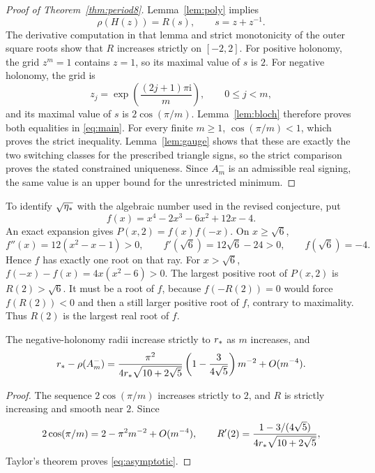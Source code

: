 \begin{proof}[Proof of Theorem~\ref{thm:period8}]
Lemma~\ref{lem:poly} implies
\[
 \rho(H(z))=R(s),\qquad s=z+z^{-1}.
\]
The derivative computation in that lemma and strict monotonicity of the
outer square roots show that $R$ increases strictly on $[-2,2]$.
For positive holonomy, the grid $z^m=1$ contains $z=1$, so its maximal
value of $s$ is $2$. For negative holonomy, the grid is
\[
 z_j=\exp\!\left(\frac{(2j+1)\pi\mathrm i}{m}\right),
 \qquad 0\le j<m,
\]
and its maximal value of $s$ is $2\cos(\pi/m)$. Lemma~\ref{lem:bloch}
therefore proves both equalities in \eqref{eq:main}.
For every finite $m\ge1$, $\cos(\pi/m)<1$, which proves the strict
inequality. Lemma~\ref{lem:gauge} shows that these are exactly the two
switching classes for the prescribed triangle signs, so the strict
comparison proves the stated constrained uniqueness. Since $A_m^-$ is
an admissible real signing, the same value is an upper bound for the unrestricted minimum.
\end{proof}

To identify $\sqrt{\eta_*}$ with the algebraic number used in the revised
conjecture, put
\[
 f(x)=x^4-2x^3-6x^2+12x-4.
\]
An exact expansion gives $P(x,2)=f(x)f(-x)$. On $x\ge\sqrt6$,
\[
 f''(x)=12(x^2-x-1)>0,\qquad
 f'(\sqrt6)=12\sqrt6-24>0,\qquad f(\sqrt6)=-4.
\]
Hence $f$ has exactly one root on that ray. For $x>\sqrt6$,
$f(-x)-f(x)=4x(x^2-6)>0$. The largest positive root of $P(x,2)$ is
$R(2)>\sqrt6$. It must be a root of $f$, because $f(-R(2))=0$ would
force $f(R(2))<0$ and then a still larger positive root of $f$, contrary
to maximality. Thus $R(2)$ is the largest real root of $f$.

\begin{corollary}\label{cor:asymptotic}
The negative-holonomy radii increase strictly to $r_*$ as $m$ increases,
and
\begin{equation}
 r_*-\rho(A_m^-)
 =\frac{\pi^2}{4r_*\sqrt{10+2\sqrt5}}
   \left(1-\frac3{4\sqrt5}\right)m^{-2}+O(m^{-4}).
 \label{eq:asymptotic}
\end{equation}
\end{corollary}
\begin{proof}
The sequence $2\cos(\pi/m)$ increases strictly to $2$, and $R$ is strictly
increasing and smooth near $2$. Since
\[
 2\cos(\pi/m)=2-\pi^2m^{-2}+O(m^{-4}),
 \qquad
 R'(2)=\frac{1-3/(4\sqrt5)}{4r_*\sqrt{10+2\sqrt5}},
\]
Taylor's theorem proves \eqref{eq:asymptotic}.
\end{proof}

